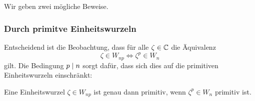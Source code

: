 \subsection{}

Wir geben zwei mögliche Beweise.



\subsubsection*{Durch primitve Einheitswurzeln}

Entscheidend ist die Beobachtung, dass für alle $\zeta \in \mathbb{C}$ die Äquivalenz
\[
        \zeta \in W_{np}
  \iff  \zeta^p \in W_n
\]
gilt.
Die Bedingung $p \mathrel{|} n$ sorgt dafür, dass sich dies auf die primitiven Einheitswurzeln einschränkt:

\begin{claim}
  Eine Einheitswurzel $\zeta \in W_{np}$ ist genau dann primitiv, wenn $\zeta^p \in W_n$ primitiv ist.
\end{claim}

